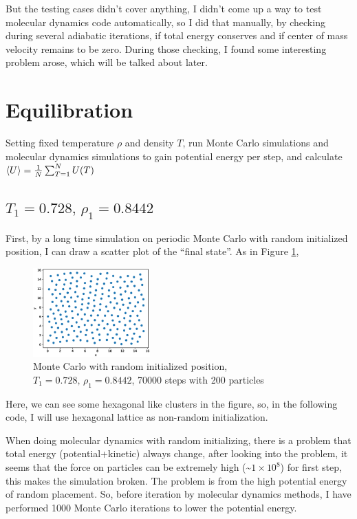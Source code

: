 \documentclass[UTF8,a4paper,no-math]{article}
\begin{document}
But the testing cases didn't cover anything, I didn't come up a way to test molecular dynamics code automatically, so I did that manually, by checking during several adiabatic iterations, if total energy conserves and if center of mass velocity remains to be zero. During
those checking, I found some interesting problem arose, which will be talked about later.

\section{Equilibration}
Setting fixed temperature $\rho$ and density $T$, run Monte Carlo simulations and molecular dynamics simulations to gain potential energy per step, and calculate
$\expval{U} = \frac{1}{N}\sum_{T=1}^N U(T)$
\subsection{$T_1 =0.728,\, \rho_1 = 0.8442$}

First, by a long time simulation on periodic Monte Carlo with random initialized position, I can draw a scatter plot of the ``final state''. As in Figure \ref{fig:scatter},
\begin{figure}[h]
	\centering
	\includegraphics[width=0.4\textwidth]{fig/rand_scatter_70000_steps_200_particles_0.8442_rho_0.728_tempure_.eps}
	\caption{Monte Carlo with random initialized position, $T_1 =0.728,\, \rho_1 = 0.8442$, 70000 steps with 200 particles}
	\label{fig:scatter}
\end{figure}

Here, we can see some hexagonal like clusters in the figure, so, in the following code, I will use hexagonal lattice as non-random initialization.

When doing molecular dynamics with random initializing, there is a problem that total energy (potential+kinetic) always change, after looking into the problem, it seems that the force on
particles can be extremely high (\~$1\times 10^{8}$) for first step, this makes the simulation broken. The problem is from the high potential energy of random placement. So, before iteration by
molecular dynamics methods, I have performed 1000 Monte Carlo iterations to lower the potential energy.
\end{document}
